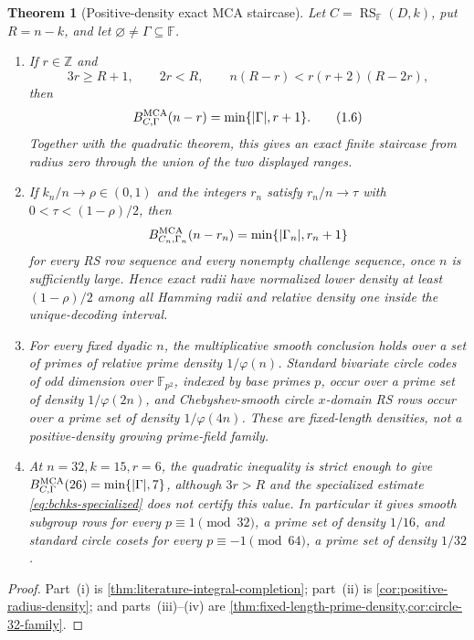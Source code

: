 \documentclass[11pt,a4paper]{amsart}
\numberwithin{equation}{section}
\newtheorem{theorem}{Theorem}[section]
\theoremstyle{remark}
\DeclareMathOperator{\RS}{RS}
\newcommand{\F}{\mathbb F}
\newcommand{\Z}{\mathbb Z}
\newcommand{\abs}[1]{\lvert #1\rvert}
\begin{document}
\begin{theorem}[Positive-density exact MCA staircase]
\label{thm:intro-positive-density}
Let \(C=\RS_\F(D,k)\), put \(R=n-k\), and let
\(\varnothing\ne\Gamma\subseteq\F\).
\begin{enumerate}[label=\textup{(\roman*)},leftmargin=*]
\item If \(r\in\Z\) and
\[
 3r\ge R+1,\qquad 2r<R,\qquad
 n(R-r)<r(r+2)(R-2r),                          \tag{1.5}
 \label{eq:intro-literature-completion}
\]
then
\[
 B_{C,\Gamma}^{\rm MCA}(n-r)=\min\{\abs\Gamma,r+1\}. \tag{1.6}
 \label{eq:intro-literature-exact}
\]
Together with the quadratic theorem, this gives an exact finite
staircase from radius zero through the union of the two displayed ranges.
\item If \(k_n/n\to\rho\in(0,1)\) and the integers
\(r_n\) satisfy \(r_n/n\to\tau\) with
\(0<\tau<(1-\rho)/2\), then
\[
 B_{C_n,\Gamma_n}^{\rm MCA}(n-r_n)
   =\min\{\abs{\Gamma_n},r_n+1\}
\]
for every RS row sequence and every nonempty challenge sequence, once
\(n\) is sufficiently large.  Hence exact radii have normalized lower
density at least \((1-\rho)/2\) among all Hamming radii and relative density one
inside the unique-decoding interval.
\item For every fixed dyadic \(n\), the multiplicative smooth conclusion
holds over a set of primes of relative prime density
\(1/\varphi(n)\).  Standard bivariate circle codes of odd dimension
over \(\F_{p^2}\), indexed by base primes \(p\), occur over a prime set
of density \(1/\varphi(2n)\), and
Chebyshev-smooth circle \(x\)-domain RS rows occur over a prime set of
density \(1/\varphi(4n)\).  These are fixed-length densities, not a
positive-density growing prime-field family.
\item At \(n=32,k=15,r=6\), the quadratic inequality is strict enough to
give \(B^{\rm MCA}_{C,\Gamma}(26)=\min\{\abs\Gamma,7\}\), although
\(3r>R\) and the specialized estimate \eqref{eq:bchks-specialized}
does not certify this value.  In
particular it gives smooth subgroup rows for every
\(p\equiv1\pmod {32}\), a prime set of density \(1/16\), and standard
circle cosets for every \(p\equiv-1\pmod {64}\), a prime set of density
\(1/32\).
\end{enumerate}
\end{theorem}

\begin{proof}
Part~\textup{(i)} is \cref{thm:literature-integral-completion};
part~\textup{(ii)} is \cref{cor:positive-radius-density}; and
parts~\textup{(iii)}--\textup{(iv)} are
\cref{thm:fixed-length-prime-density,cor:circle-32-family}.
\end{proof}
\end{document}
